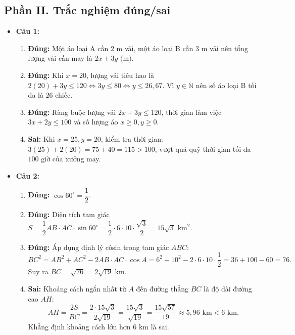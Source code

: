 \documentclass[12pt,a4paper]{article}
\begin{document}
\subsection*{Phần II. Trắc nghiệm đúng/sai}
\begin{itemize}[leftmargin=0.6cm, itemsep=4pt]
\item \textbf{Câu 1:}
\begin{enumerate}
    \item \textbf{Đúng:} Một áo loại A cần $2\text{ m}$ vải, một áo loại B cần $3\text{ m}$ vải nên tổng lượng vải cần may là $2x + 3y\text{ (m)}$.
    \item \textbf{Đúng:} Khi $x = 20$, lượng vải tiêu hao là $2(20) + 3y \leq 120 \iff 3y \leq 80 \iff y \leq 26{,}67$. Vì $y \in \mathbb{N}$ nên số áo loại B tối đa là $26$ chiếc.
    \item \textbf{Đúng:} Ràng buộc lượng vải $2x + 3y \leq 120$, thời gian làm việc $3x + 2y \leq 100$ và số lượng áo $x \geq 0, y \geq 0$.
    \item \textbf{Sai:} Khi $x = 25, y = 20$, kiểm tra thời gian: $3(25) + 2(20) = 75 + 40 = 115 > 100$, vượt quá quỹ thời gian tối đa $100\text{ giờ}$ của xưởng may.
\end{enumerate}

\item \textbf{Câu 2:}
\begin{enumerate}
    \item \textbf{Đúng:} $\cos 60^\circ = \dfrac{1}{2}$.
    \item \textbf{Đúng:} Diện tích tam giác $S = \dfrac{1}{2}AB\cdot AC\cdot\sin 60^\circ = \dfrac{1}{2}\cdot 6\cdot 10\cdot\dfrac{\sqrt{3}}{2} = 15\sqrt{3}\text{ km}^2$.
    \item \textbf{Đúng:} Áp dụng định lý côsin trong tam giác $ABC$:
    \[
    BC^2 = AB^2 + AC^2 - 2AB\cdot AC\cdot\cos A = 6^2 + 10^2 - 2\cdot 6\cdot 10\cdot\dfrac{1}{2} = 36 + 100 - 60 = 76.
    \]
    Suy ra $BC = \sqrt{76} = 2\sqrt{19}\text{ km}$.
    \item \textbf{Sai:} Khoảng cách ngắn nhất từ $A$ đến đường thẳng $BC$ là độ dài đường cao $AH$:
    \[
    AH = \dfrac{2S}{BC} = \dfrac{2\cdot 15\sqrt{3}}{2\sqrt{19}} = \dfrac{15\sqrt{3}}{\sqrt{19}} = \dfrac{15\sqrt{57}}{19} \approx 5{,}96\text{ km} < 6\text{ km}.
    \]
    Khẳng định khoảng cách lớn hơn $6\text{ km}$ là sai.
\end{enumerate}
\end{itemize}
\end{document}
